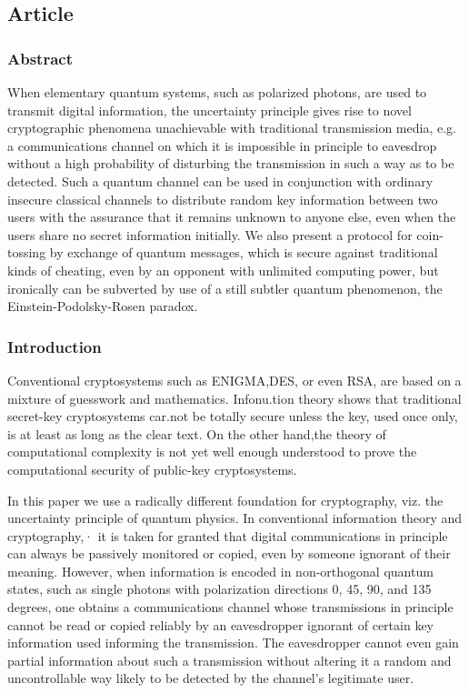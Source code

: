 \subsection{Article}

\subsubsection*{Abstract}
When elementary quantum systems, such as polarized photons, are used to transmit digital information, the uncertainty principle gives rise to novel cryptographic phenomena unachievable with traditional transmission media, e.g. a communications channel on which it is impossible in principle to eavesdrop without a high probability of disturbing the transmission in such a way as to be detected. Such a quantum channel can be used in conjunction with ordinary insecure classical channels to distribute random key information between two users with the assurance that it remains unknown to anyone else, even when the users share no secret information initially. We also present a protocol for coin-tossing by exchange of quantum messages, which is secure against traditional kinds of cheating, even by an opponent with unlimited computing power, but ironically can be subverted by use of a still subtler quantum phenomenon, the Einstein-Podolsky-Rosen paradox.

\subsubsection{Introduction}

Conventional cryptosystems such as ENIGMA,DES, or even RSA, are based on a mixture of guess­work and mathematics. Infonu.tion theory shows that traditional secret-key cryptosystems car.not be to­tally secure unless the key, used once only, is at least as long as the clear text. On the other hand,the theory of computational complexity is not yet well enough understood to prove the computational security of public-key cryptosystems.

In this paper we use a radically different foundation for cryptography, viz. the uncertainty principle of quantum physics. In conventional information  theory and cryptography,· it is taken for granted that digital communications in principle can always be passively monitored or copied, even by someone ignorant of their meaning. However, when information is encoded in non-orthogonal quantum states, such as single photons with polarization directions 0, 45, 90, and 135 degrees, one obtains a communications channel whose transmissions in prin­ciple cannot be read or copied reliably by an eaves­dropper ignorant of certain key information used informing the transmission. The eavesdropper cannot even gain partial information about such a transmis­sion without altering it a random and uncontrollable way likely to be detected by the channel's legiti­mate user.

